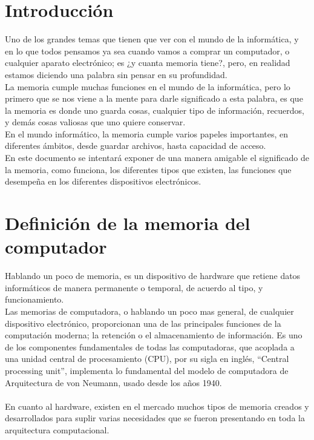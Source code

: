 \documentclass[10pt,letterpaper]{article}
\begin{document}
\tableofcontents

\newpage
\section{Introducción}

\begin{justify}
	Uno de los grandes temas que tienen que ver con el mundo de la informática, y en lo que todos pensamos ya sea cuando vamos a comprar un computador, o cualquier aparato electrónico; es ¿y cuanta memoria tiene?, pero, en realidad estamos diciendo una palabra sin pensar en su profundidad.\\
	
	\noindent
	La memoria cumple muchas funciones en el mundo de la informática, pero lo primero que se nos viene a la mente para darle significado a esta palabra, es que la memoria es donde uno guarda cosas, cualquier tipo de información, recuerdos, y demás cosas valiosas que uno quiere conservar.\\
	
	\noindent
	En el mundo informático, la memoria cumple varios papeles importantes, en diferentes ámbitos, desde guardar archivos, hasta capacidad de acceso.\\
	
	\noindent
	En este documento se intentará exponer de una manera amigable el significado de la memoria, como funciona, los diferentes tipos que existen, las funciones que desempeña en los diferentes dispositivos electrónicos.
\end{justify}

\newpage
\section{Definición de la memoria del computador} \label{contenido}

\begin{justify}
	Hablando un poco de memoria, es un dispositivo de hardware que retiene datos informáticos de manera permanente o temporal, de acuerdo al tipo, y funcionamiento.\\
	
	\noindent
	Las memorias de computadora, o hablando un poco mas general, de cualquier dispositivo electrónico, proporcionan una de las principales funciones de la computación moderna; la retención o el almacenamiento de información. Es uno de los componentes fundamentales de todas las computadoras, que acoplada a una unidad central de procesamiento (CPU), por su sigla en inglés, “Central processing unit”, implementa lo fundamental del modelo de computadora de Arquitectura de von Neumann, usado desde los años 1940.\\ 
	\cite{definicion}\\
	
	\noindent
	En cuanto al hardware, existen en el mercado muchos tipos de memoria creados y desarrollados para suplir varias necesidades que se fueron presentando en toda la arquitectura computacional.
	
\end{justify}
 
\end{document}
